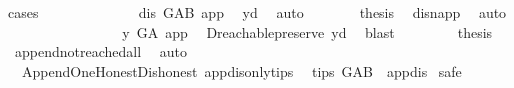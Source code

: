 \begin{isabellebody}
{\isacharparenleft}{\kern0pt}cases{\isacharparenright}{\kern0pt}\isanewline
\ \ \ \ \isamarkupfalse%
\ {}\isanewline
\ \ \ \ \isamarkupfalse%
\ \isamarkupfalse%
\ {\isachardoublequoteopen}dis\ {\isasymrightarrow}\isactrlbsub G{\isacharunderscore}{\kern0pt}AB\isactrlesub \ app{\isachardoublequoteclose}\ \isamarkupfalse%
\ y{\isacharunderscore}{\kern0pt}d\ \isamarkupfalse%
\ auto\isanewline
\ \ \ \ \isamarkupfalse%
\ \isamarkupfalse%
\ {\isacharquery}{\kern0pt}thesis\ \isamarkupfalse%
\ dis{\isacharunderscore}{\kern0pt}n{\isacharunderscore}{\kern0pt}app\ \isamarkupfalse%
\ auto\isanewline
\ \ \isamarkupfalse%
\isanewline
\ \ \ \ \isamarkupfalse%
\ {}\isanewline
\ \ \ \ \isamarkupfalse%
\ \isamarkupfalse%
\ {\isachardoublequoteopen}y\ {\isasymrightarrow}\isactrlsup {\isacharplus}{\kern0pt}\isactrlbsub G{\isacharunderscore}{\kern0pt}A\isactrlesub \ app{\isachardoublequoteclose}\ \isamarkupfalse%
\ D{}{\isachardot}{\kern0pt}reachable{}{\isacharunderscore}{\kern0pt}preserve\ y{\isacharunderscore}{\kern0pt}d\ \isamarkupfalse%
\ blast\ \isanewline
\ \ \ \ \isamarkupfalse%
\ \isamarkupfalse%
\ {\isacharquery}{\kern0pt}thesis\ \isamarkupfalse%
\ append{\isacharunderscore}{\kern0pt}not{\isacharunderscore}{\kern0pt}reached{\isacharunderscore}{\kern0pt}all\ \isamarkupfalse%
\ auto\isanewline
\ \ \isamarkupfalse%
\ \isanewline
{}\isamarkupfalse%
%
\endisatagproof
{\isafoldproof}%
%
\isadelimproof
\ \ \ \isanewline
%
\endisadelimproof
\isanewline
\isanewline
{}\isamarkupfalse%
\ {\isacharparenleft}{\kern0pt}\ Append{\isacharunderscore}{\kern0pt}One{\isacharunderscore}{\kern0pt}Honest{\isacharunderscore}{\kern0pt}Dishonest{\isacharparenright}{\kern0pt}\ app{\isacharunderscore}{\kern0pt}dis{\isacharunderscore}{\kern0pt}only{\isacharunderscore}{\kern0pt}tips{\isacharcolon}{\kern0pt}\isanewline
\ \ {\isachardoublequoteopen}tips\ G{\isacharunderscore}{\kern0pt}AB\ {\isacharequal}{\kern0pt}\ {\isacharbraceleft}{\kern0pt}app{\isacharcomma}{\kern0pt}dis{\isacharbraceright}{\kern0pt}{\isachardoublequoteclose}\isanewline
%
\isadelimproof
%
\endisadelimproof
%
\isatagproof
{}\isamarkupfalse%
\ safe\isanewline
\ \ \isamarkupfalse%

\end{isabellebody}
